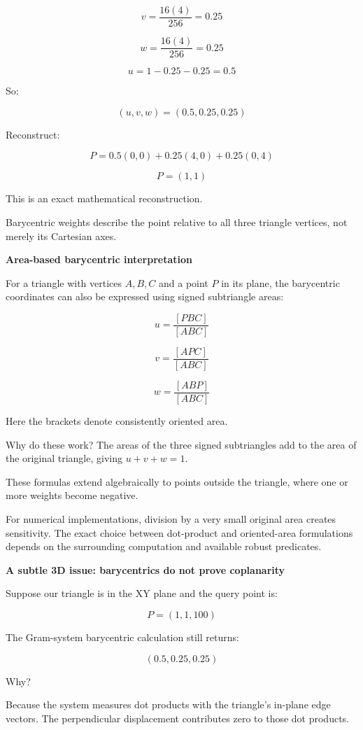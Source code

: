 \[
v=\frac{16(4)}{256}=0.25
\]

\[
w=\frac{16(4)}{256}=0.25
\]

\[
u=1-0.25-0.25=0.5
\]

So:

\[
\boxed{(u,v,w)=(0.5,0.25,0.25)}
\]

Reconstruct:

\[
P=0.5(0,0)+0.25(4,0)+0.25(0,4)
\]

\[
P=(1,1)
\]

This is an exact mathematical reconstruction.

Barycentric weights describe the point relative to all three triangle vertices, not merely its Cartesian axes.

\textbf{Area-based barycentric interpretation}

For a triangle with vertices \(A,B,C\) and a point \(P\) in its plane, the barycentric coordinates can also be expressed using signed subtriangle areas:

\[
u=\frac{[PBC]}{[ABC]}
\]

\[
v=\frac{[APC]}{[ABC]}
\]

\[
w=\frac{[ABP]}{[ABC]}
\]

Here the brackets denote consistently oriented area.

Why do these work? The areas of the three signed subtriangles add to the area of the original triangle, giving \(u+v+w=1\).

These formulas extend algebraically to points outside the triangle, where one or more weights become negative.

For numerical implementations, division by a very small original area creates sensitivity. The exact choice between dot-product and oriented-area formulations depends on the surrounding computation and available robust predicates.

\textbf{A subtle 3D issue: barycentrics do not prove coplanarity}

Suppose our triangle is in the XY plane and the query point is:

\[
P=(1,1,100)
\]

The Gram-system barycentric calculation still returns:

\[
(0.5,0.25,0.25)
\]

Why?

Because the system measures dot products with the triangle's in-plane edge vectors. The perpendicular displacement contributes zero to those dot products.

